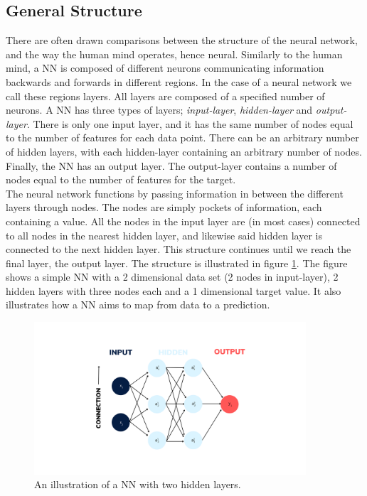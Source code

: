 \subsection{General Structure}
There are often drawn comparisons between the structure of the neural network, 
and the way the human mind operates, hence neural. Similarly to the human mind, a \ac{NN} is 
composed of different neurons communicating information backwards and forwards in different 
regions. In the case of a neural network we call these regions layers. All layers
are composed of a specified number of neurons. A \ac{NN} has three types of layers;
\emph{input-layer}, \emph{hidden-layer} and \emph{output-layer}. There is only one input layer, and it has
the same number of nodes equal to the number of features for each data point. 
There can be an arbitrary number of hidden layers, with each hidden-layer containing
an arbitrary number of nodes. Finally, the \ac{NN} has an output layer. The output-layer
contains a number of nodes equal to the number of features for the target.
\\
The neural network functions by passing information in between the different layers through 
nodes. The nodes are simply pockets of information, each containing a value. 
All the nodes in the input layer are (in most cases) connected to all nodes in the nearest hidden layer,
and likewise said hidden layer is connected to the next hidden layer. This structure continues
until we reach the final layer, the output layer. The structure is illustrated in figure
\ref{fig:NN}. The figure shows a simple \ac{NN} with a 2 dimensional data set (2 nodes in input-layer),
2 hidden layers with three nodes each and a 1 dimensional target value. It also illustrates 
how a \ac{NN} aims to map from data to a prediction.
\begin{figure}
    \centering
    \vspace*{-12.5mm} 
    \includegraphics[width=0.9\textwidth]{Figures/Illustrations/Input_labels.png}
    \vspace*{-12.5mm} 
    \caption{An illustration of a \ac{NN} with two hidden layers.}
    \label{fig:NN}
\end{figure}
